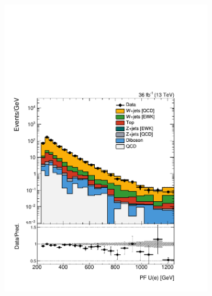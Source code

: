 \begin{figure}[]
\begin{center}
\begin{subfigure}[t]{0.24\textwidth}
            \includegraphics[width=\textwidth]{figures/vbf/prefit/singleelectron_pfUWmag_logy.pdf}
        \end{subfigure} \\ 
        \begin{subfigure}[t]{0.24\textwidth}

\end{subfigure}
\end{center}
\end{figure}
